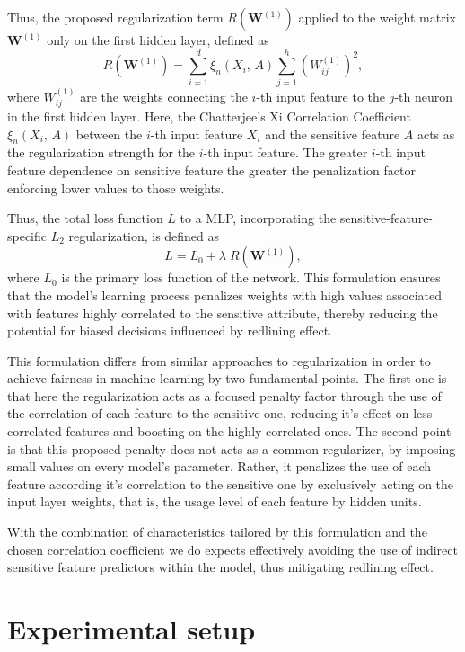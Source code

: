 Thus, the proposed regularization term $R(\mathbf{W}^{(1)})$ applied to the weight matrix $\mathbf{W}^{(1)}$ only on the first hidden layer, defined as 
\begin{equation}\label{eq:xi_reg}
R(\mathbf{W}^{(1)}) = \sum_{i=1}^d \xi_n(X_i,\,A) \sum_{j=1}^h (W^{(1)}_{ij})^2,
\end{equation}
where $W^{(1)}_{ij}$ are the weights connecting the $i$-th input feature to the $j$-th neuron in the first hidden layer. Here, the Chatterjee's Xi Correlation Coefficient $\xi_n(X_i,\,A)$ between the $i$-th input feature $X_i$ and the sensitive feature $A$ acts as the regularization strength for the $i$-th input feature. The greater $i$-th input feature dependence on sensitive feature the greater the penalization factor enforcing lower values to those weights.

Thus, the total loss function $L$ to a MLP, incorporating the sensitive-feature-specific $L_2$ regularization, is defined as
\begin{equation}\label{eq:total_regularized_loss}
L = L_0 + \lambda \; R(\mathbf{W}^{(1)}),
\end{equation}
where $L_0$ is the primary loss function of the network. This formulation ensures that the model's learning process penalizes weights with high values associated with features highly correlated to the sensitive attribute, thereby reducing the potential for biased decisions influenced by redlining effect.

This formulation differs from similar approaches to regularization in order to achieve fairness in machine learning by two fundamental points.  The first one is that here the regularization acts as a focused penalty factor through the use of the correlation of each feature to the sensitive one, reducing it's effect on less correlated features and boosting on the highly correlated ones. The second point is that this proposed penalty does not acts as a common regularizer, by imposing small values on every model's parameter. Rather, it penalizes the use of each feature according it's correlation to the sensitive one by exclusively acting on the input layer weights, that is, the usage level of each feature by hidden units.

With the combination of characteristics tailored by this formulation and the chosen correlation coefficient we do expects effectively avoiding the use of indirect sensitive feature predictors within the model, thus mitigating redlining effect.

\section{Experimental setup} \label{sec:rpr_experimental}

